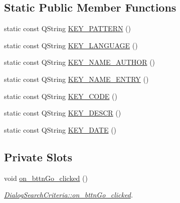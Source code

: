 \subsection*{Static Public Member Functions}
\begin{DoxyCompactItemize}
\item 
static const Q\+String \hyperlink{class_dialog_search_criteria_a855feb356d17d2631bf7251f1a501ce1}{K\+E\+Y\+\_\+\+P\+A\+T\+T\+E\+R\+N} ()
\item 
static const Q\+String \hyperlink{class_dialog_search_criteria_a3f9f43120bea93348999826e4071310d}{K\+E\+Y\+\_\+\+L\+A\+N\+G\+U\+A\+G\+E} ()
\item 
static const Q\+String \hyperlink{class_dialog_search_criteria_ac49318706a518f848fe9b4902c120e8d}{K\+E\+Y\+\_\+\+N\+A\+M\+E\+\_\+\+A\+U\+T\+H\+O\+R} ()
\item 
static const Q\+String \hyperlink{class_dialog_search_criteria_a9b57352b785dc4b716e171c7835b0ff8}{K\+E\+Y\+\_\+\+N\+A\+M\+E\+\_\+\+E\+N\+T\+R\+Y} ()
\item 
static const Q\+String \hyperlink{class_dialog_search_criteria_a874909d0b8c007695ef40120bc290157}{K\+E\+Y\+\_\+\+C\+O\+D\+E} ()
\item 
static const Q\+String \hyperlink{class_dialog_search_criteria_a8c29bb9a9d48246950ff23abee75d059}{K\+E\+Y\+\_\+\+D\+E\+S\+C\+R} ()
\item 
static const Q\+String \hyperlink{class_dialog_search_criteria_a2db45b1bebeb55547c213dd558342bb7}{K\+E\+Y\+\_\+\+D\+A\+T\+E} ()
\end{DoxyCompactItemize}
\subsection*{Private Slots}
\begin{DoxyCompactItemize}
\item 
void \hyperlink{class_dialog_search_criteria_a0e106dc53e15508c8d8bf59308870371}{on\+\_\+bttn\+Go\+\_\+clicked} ()
\begin{DoxyCompactList}\small\item\em \hyperlink{class_dialog_search_criteria_a0e106dc53e15508c8d8bf59308870371}{Dialog\+Search\+Criteria\+::on\+\_\+bttn\+Go\+\_\+clicked}. \end{DoxyCompactList}\end{DoxyCompactItemize}
